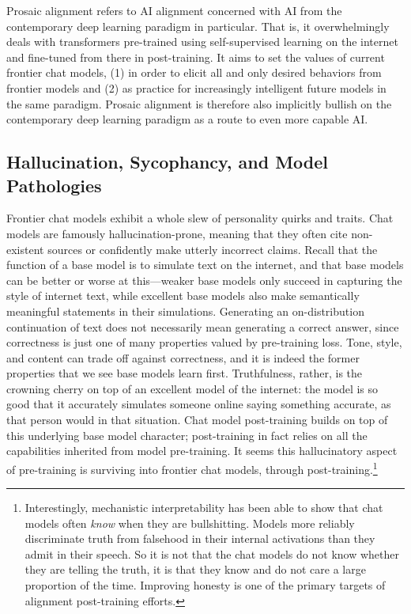 Prosaic alignment refers to AI alignment concerned with AI from the
contemporary deep learning paradigm in particular. That is, it overwhelmingly
deals with transformers pre-trained using self-supervised learning on the
internet and fine-tuned from there in post-training. It aims to set the values
of current frontier chat models, (1) in order to elicit all and only desired
behaviors from frontier models and (2) as practice for increasingly intelligent
future models in the same paradigm. Prosaic alignment is therefore also
implicitly bullish on the contemporary deep learning paradigm as a route to
even more capable AI.

\subsection{Hallucination, Sycophancy, and Model Pathologies}
Frontier chat models exhibit a whole slew of personality quirks and traits.
Chat models are famously hallucination-prone, meaning that they often cite
non-existent sources or confidently make utterly incorrect claims. Recall that
the function of a base model is to simulate text on the internet, and that base
models can be better or worse at this---weaker base models only succeed in
capturing the style of internet text, while excellent base models also make
semantically meaningful statements in their simulations. Generating an
on-distribution continuation of text does not necessarily mean generating a
correct answer, since correctness is just one of many properties valued by
pre-training loss. Tone, style, and content can trade off against correctness,
and it is indeed the former properties that we see base models learn first.
Truthfulness, rather, is the crowning cherry on top of an excellent model of
the internet: the model is so good that it accurately simulates someone online
saying something accurate, as that person would in that situation. Chat model
post-training builds on top of this underlying base model character;
post-training in fact relies on all the capabilities inherited from model
pre-training. It seems this hallucinatory aspect of pre-training is surviving
into frontier chat models, through post-training.\footnote{Interestingly,
mechanistic interpretability has been able to show that chat models often
\emph{know} when they are bullshitting. Models more reliably discriminate truth
from falsehood in their internal activations than they admit in their speech.
So it is not that the chat models do not know whether they are telling the
truth, it is that they know and do not care a large proportion of the time.
Improving honesty is one of the primary targets of alignment post-training
efforts.}

